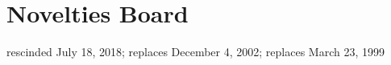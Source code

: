 \section{Novelties Board}
rescinded July 18, 2018; replaces December 4, 2002; replaces March 23, 1999
